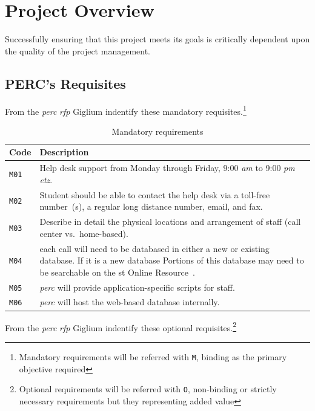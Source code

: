 \clearpage
\section{Project Overview}\label{project-overview}
Successfully ensuring that this project meets its goals is critically dependent upon the quality of the project management.

\subsection{PERC's Requisites}
From the \textit{\gls{perc}} \textit{\gls{rfp}} Giglium indentify these mandatory requisites.\footnote{Mandatory requirements will be referred with \texttt{M}, binding as the primary objective required}

\begin{table}[H]
	\centering
	\begin{tabular}{|l|l|} 
		\hline
		\textbf{Code} & \textbf{Description} \\
		\hline
		\texttt{M01} & \parbox{15 cm}{Help desk support from Monday through Friday, 9:00 \textit{\gls{am}} to 9:00 \textit{\gls{pm}} \textit{\gls{etz}}.} \\
		\hline
		\texttt{M02} & \parbox{15 cm}{Student should be able to contact the help desk via a toll-free number~(s), a regular long distance number, email, and fax.} \\
		\hline
		\texttt{M03} & \parbox{15 cm}{Describe in detail the physical locations and arrangement of staff (call center vs.\ home-based).} \\
		\hline
		\texttt{M04} & \parbox{15 cm}{each call will need to be databased in either a new or existing database. If it is a new database Portions of this database may need to be searchable on the \gls{st} Online Resource~\cite{propanesafety}.} \\
		\hline
		\texttt{M05} & \parbox{15 cm}{\textit{\gls{perc}} will provide application-specific scripts for staff.} \\
		\hline
		\texttt{M06} & \parbox{15 cm}{\textit{\gls{perc}} will host the web-based database internally.} \\
		\hline
	\end{tabular}
	\caption{Mandatory requirements}\label{tab:m_requirements}
\end{table}
\noindent From the \textit{\gls{perc}} \textit{\gls{rfp}} Giglium indentify these optional requisites.\footnote{Optional requirements will be referred with \texttt{O}, non-binding or strictly necessary requirements but they representing added value}

